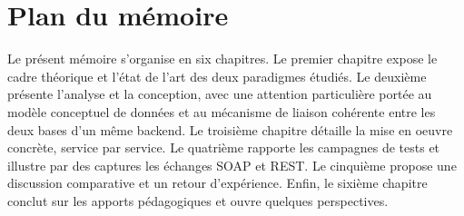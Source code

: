 \section*{Plan du mémoire}

Le présent mémoire s'organise en six chapitres. Le premier chapitre expose le cadre théorique et l'état de l'art des deux paradigmes étudiés. Le deuxième présente l'analyse et la conception, avec une attention particulière portée au modèle conceptuel de données et au mécanisme de liaison cohérente entre les deux bases d'un même backend. Le troisième chapitre détaille la mise en oeuvre concrète, service par service. Le quatrième rapporte les campagnes de tests et illustre par des captures les échanges SOAP et REST. Le cinquième propose une discussion comparative et un retour d'expérience. Enfin, le sixième chapitre conclut sur les apports pédagogiques et ouvre quelques perspectives.
